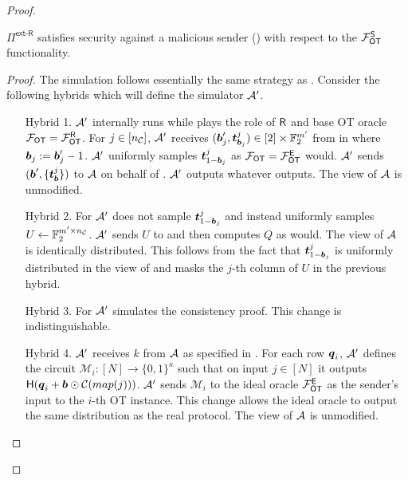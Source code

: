 
\begin{proof}\label{proof:ext_R_S}
		\begin{claim}\label{claim:ext-R-S-MalSender}
		$\Pi^{\textsf{ext-R}}$ satisfies security against a malicious sender () with respect to the $\mathcal{F}_{\mathsf{OT}}^\mathsf{S}$ functionality.
	\end{claim}
	\begin{proof}
		
		The simulation follows essentially the same strategy as . Consider the following hybrids which will define the simulator $\mathcal{A}'$. 
		\begin{enumerate}[leftmargin=1.8cm]
			\item[Hybrid 1.] $\mathcal{A}'$ internally runs \Adv while plays the role of $\mathsf{R}$ and base OT oracle $\mathcal{F}_{\mathsf{OT}}=\mathcal{F}_{\mathsf{OT}}^\mathsf{R}$. For $j\in[{n_\mathcal{C}}]$, $\mathcal{A}'$ receives $(\boldsymbol{b}'_j,\boldsymbol{t}^j_{\boldsymbol{b}_j})\in [2]\times \mathbb{F}^{m'}_2$ from \Adv in  where $\boldsymbol{b}_j:=\boldsymbol{b}_j'-1$. $\mathcal{A}'$ uniformly samples $\boldsymbol{t}^j_{1-\boldsymbol{b}_j}$ as $\mathcal{F}_{\mathsf{OT}}=\mathcal{F}_{\mathsf{OT}}^\mathsf{E}$ would. $\mathcal{A}'$ sends $(\boldsymbol{b}', \{\boldsymbol{t}^j_{\boldsymbol{b}}\})$ to $\mathcal{A}$ on behalf of \OOT. $\mathcal{A}'$ outputs whatever \Adv outputs. The view of $\mathcal{A}$ is unmodified.
			
			\item[Hybrid 2.] For  $\mathcal{A}'$ does not sample $\boldsymbol{t}^j_{1-\boldsymbol{b}_j}$ and instead uniformly samples $U\gets\mathbb{F}^{m'\times {n_\mathcal{C}}}_2$. $\mathcal{A}'$ sends $U$ to \Adv and then computes $Q$ as \send would. The view of $\mathcal{A}$ is identically distributed. This follows from the fact that $\boldsymbol{t}^j_{1-\boldsymbol{b}_j}$ is uniformly distributed in the view of \Adv and masks the $j$-th column of $U$ in the previous hybrid. 
			
			\item[Hybrid 3.] For  $\mathcal{A}'$ simulates the consistency proof. This change is indistinguishable. 
			
			\item[Hybrid 4.]\label{hybrid:mmmm} $\mathcal{A}'$ receives $k$ from $\mathcal{A}$ as specified in . For each row $\boldsymbol{q}_i$, $\mathcal{A}'$ defines the circuit $\mathcal{M}_i:[N]\rightarrow\{0,1\}^\kappa$ such that on input $j\in[N]$ it outputs $\mathsf{H}( \boldsymbol{q}_i+\boldsymbol{b}\odot \mathcal{C}(map(j)))$. $\mathcal{A}'$ sends $\mathcal{M}_i$ to the ideal oracle $\mathcal{F}_{\mathsf{OT}}^\mathsf{E}$ as the sender's input to the $i$-th OT instance. This change allows the ideal oracle to output the same distribution as the real protocol. The view of $\mathcal{A}$ is unmodified.
			

\end{enumerate}
\end{proof}
\end{proof}
